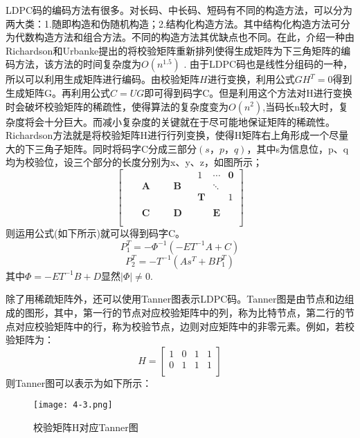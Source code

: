 \documentclass{article}
\begin{document}
LDPC码的编码方法有很多。对长码、中长码、短码有不同的构造方法，可以分为两大类：1.随即构造和伪随机构造；2.结构化构造方法。其中结构化构造方法可分为代数构造方法和组合方法。不同的构造方法其优缺点也不同。在此，介绍一种由Richardson和Urbanke提出的将校验矩阵重新排列使得生成矩阵为下三角矩阵的编码方法，该方法的时间复杂度为$O(n^{1.5})$ \cite{richardson2001efficient}.
由于LDPC码也是线性分组码的一种，所以可以利用生成矩阵进行编码。由校验矩阵$H$进行变换，利用公式$GH^T = 0$得到生成矩阵G。再利用公式$C = UG$即可得到码字C。但是利用这个方法对H进行变换时会破坏校验矩阵的稀疏性，使得算法的复杂度变为$O(n^2)$,当码长n较大时，复杂度将会十分巨大。而减小复杂度的关键就在于尽可能地保证矩阵的稀疏性。Richardson方法就是将校验矩阵H进行行列变换，使得H矩阵右上角形成一个尽量大的下三角子矩阵。同时将码字C分成三部分$(s，p，q)$，其中s为信息位，p、q均为校验位，设三个部分的长度分别为x、y、z，如图所示；
$$
\begin{bmatrix}
     &  &  &  &  &  & & 1 & \cdots & \mathbf{0} \\
     &  & \mathbf{A} &  &  & \mathbf{B} & &  & \ddots &  \\
     &  &  &  &  &  & & \mathbf{T} &    & 1 \\
     &  &  &  &  &  & & &  &  \\
     &  & \mathbf{C} &  &  & \mathbf{D} & &  & \mathbf{E} &  \\
     &  &  &  &  &  &  & &    &  \\
\end{bmatrix}
$$
则运用公式(如下所示)就可以得到码字C。
\begin{equation}
    P_1^T = -\Phi^{-1}(-ET^{-1}A + C) 
\end{equation}
\begin{equation}
    P_2^T = -T^{-1}(As^T + BP_1^T)
\end{equation}
其中$\Phi = -ET^{-1}B + D$显然$|\Phi| \neq 0$.

除了用稀疏矩阵外，还可以使用Tanner图表示LDPC码。Tanner图是由节点和边组成的图形，其中，第一行的节点对应校验矩阵中的列，称为比特节点，第二行的节点对应校验矩阵中的行，称为校验节点，边则对应矩阵中的非零元素。例如，若校验矩阵为：
$$
H = \begin{bmatrix}
    1 & 0 & 1 & 1 \\
    0 & 1 & 1 & 1\\
\end{bmatrix}
$$
则Tanner图可以表示为如下所示：

\begin{figure}[h]
  \centering
  \texttt{[image: 4-3.png]}
  \caption{校验矩阵H对应Tanner图}
\end{figure}
\end{document}
